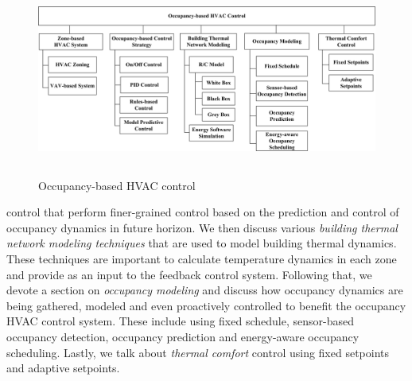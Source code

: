 \begin{figure}[hb]
\centering
\includegraphics[height=2.5in,keepaspectratio]{figs/background_configurations.jpg}	
\caption{Occupancy-based HVAC control}
\label{fig:background:config}
\end{figure}

\noindent control that perform finer-grained control based on the prediction and control of occupancy dynamics in future horizon. We then discuss various \emph{building thermal network modeling techniques} that are used to model building thermal dynamics. These techniques are important to calculate temperature dynamics in each zone and provide as an input to the feedback control system. Following that, we devote a section on \emph{occupancy modeling} and discuss how occupancy dynamics are being gathered, modeled and even proactively controlled to benefit the occupancy HVAC control system. These include using fixed schedule, sensor-based occupancy detection, occupancy prediction and energy-aware occupancy scheduling. Lastly, we talk about \emph{thermal comfort} control using fixed setpoints and adaptive setpoints.




